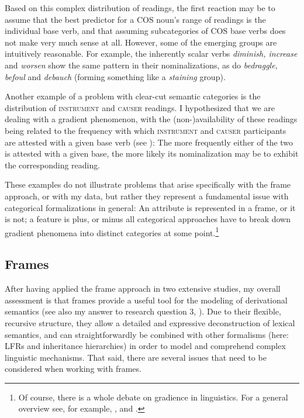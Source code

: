 Based on this complex distribution of readings, the first reaction may be to assume that the best predictor for a COS noun's range of readings is the individual base verb, and that assuming subcategories of COS base verbs does not make very much sense at all. However, some of the emerging groups are intuitively reasonable. For example, the inherently scalar verbs \textit{diminish, increase} and \textit{worsen} show the same pattern in their nominalizations, as do \textit{bedraggle, befoul} and \textit{debauch} (forming something like a \textit{staining} group).

Another example of a problem with clear-cut semantic categories is the distribution of \textsc{instrument} and \textsc{causer} readings. I hypothesized that we are dealing with a gradient phenomenon, with the (non-)availability of these readings being related to the frequency with which \textsc{instrument} and \textsc{causer} participants are attested with a given base verb (see ): The more frequently either of the two is attested with a given base, the more likely its nominalization may be to exhibit the corresponding reading.

\begin{sloppypar}
These examples do not illustrate problems that arise specifically with the frame approach, or with my data, but rather they represent a fundamental issue with categorical formalizations in general: An attribute is represented in a frame, or it is not; a feature is plus, or minus \textendash{} all categorical approaches have to break down gradient phenomena into distinct categories at some point.\footnote{Of course, there is a whole debate on gradience in linguistics. For a general overview see, for example, \citet{Hay.2005}, \citet{Aarts.2007} and \citet{Lappin.2015}.} 
\end{sloppypar}

\subsection{Frames}
\label{sec:disc-evaluation-frames}

After having applied the frame approach in two extensive studies, my overall assessment is that frames provide a useful tool for the modeling of derivational semantics (see also my answer to research question 3, ). Due to their flexible, recursive structure, they allow a detailed and expressive deconstruction of lexical semantics, and can straightforwardly be combined with other formalisms (here: LFRs and inheritance hierarchies) in order to model and comprehend complex linguistic mechanisms. That said, there are several issues that need to be considered when working with frames.  

